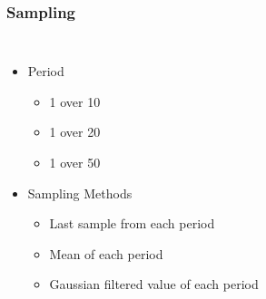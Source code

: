 \documentclass{beamer}
\begin{document}
\begin{frame}
\frametitle{Sampling}
\begin{columns}
\begin{itemize}
\item Period
	\begin{itemize}
	\item 1 over 10
	\item 1 over 20
	\item 1 over 50
	\end{itemize}
\item Sampling Methods
	\begin{itemize}
	\item Last sample from each period
	\item Mean of each period
	\item Gaussian filtered value of each period
	\end{itemize}
\end{itemize}

\begin{table}[]
\centering
\caption{Sampling and Models}
\label{sampling_models}
\end{table}
\end{columns}
\end{frame}
\end{document}
